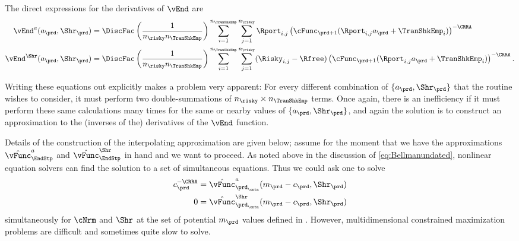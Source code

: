 \documentclass[\econtexRoot/SolvingMicroDSOPs]{subfiles}
\begin{document}
The direct expressions for the derivatives of $\vEnd$ are
\begin{equation}\begin{gathered}\begin{aligned}
      \vEnd^{{a}}({a}_{\prd},\Shr_{\prd})  & = \DiscFac \left(\frac{1}{n_{\risky} n_{\TranShkEmp}}\right)\sum_{i=1}^{n_{\TranShkEmp}}\sum_{j=1}^{n_{\risky} }\Rport_{i,j} \left(\cFunc_{\prd+1}(\Rport_{i,j}{a}_{\prd}+\TranShkEmp_{i})\right)^{-\CRRA}
      \\      \vEnd^{\Shr}({a}_{\prd},\Shr_{\prd})  & = \DiscFac \left(\frac{1}{n_{\risky} n_{\TranShkEmp}}\right)\sum_{i=1}^{n_{\TranShkEmp}}\sum_{j=1}^{n_{\risky} }(\Risky_{i,j}-\Rfree)\left(\cFunc_{\prd+1}(\Rport_{i,j}{a}_{\prd}+\TranShkEmp_{i})\right)^{-\CRRA}.
    \end{aligned}\end{gathered}\end{equation}

Writing these equations out explicitly makes a problem very apparent: For every different combination of $\{{a}_{\prd},\Shr_{\prd}\}$ that the routine wishes to consider, it must perform two double-summations of $n_{\risky} \times n_{\TranShkEmp}$ terms.  Once again, there is an inefficiency if it must perform these same calculations many times for the same or nearby values of $\{{a}_{\prd},\Shr_{\prd}\}$, and again the solution is to construct an approximation to the (inverses of the) derivatives of the $\vEnd$ function.

Details of the construction of the interpolating approximation are given below; assume for the moment that we have the approximations $\hat{\vFunc}_{\EndStp}^{{a}}$ and $\hat{\vFunc}_{\EndStp}^{\Shr}$ in hand and we want to proceed.  As noted above in the discussion of \eqref{eq:Bellmanundated}, nonlinear equation solvers can find the solution to a set of simultaneous equations.  Thus we could ask one to solve
\begin{equation}\begin{gathered}\begin{aligned}
      {c}_{\prd}^{-\CRRA}  & = \hat{\vFunc}^{a}_{{\prd_\cntn}}({m}_{\prd}-{c}_{\prd},\Shr_{\prd}) %
      \\      0  & = \hat{\vFunc}^{\Shr}_{{\prd_\cntn}}({m}_{\prd}-{c}_{\prd},\Shr_{\prd}) \label{eq:FOCwrtw}
    \end{aligned}\end{gathered}\end{equation}
simultaneously for $\cNrm$ and $\Shr$ at the set of potential ${m}_{\prd}$ values defined in {\mVec}. However, multidimensional constrained
maximization problems are difficult and sometimes quite slow to
solve.
\end{document}
